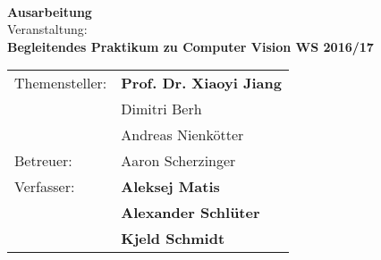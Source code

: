 \thispagestyle{empty}
\begin{center}
\vspace*{2cm}
\vspace*{2cm}
\Large
\textbf{\inserttitle}\\
\normalsize
\vspace*{2cm}
\textbf{Ausarbeitung}\\
\vspace*{1cm}
Veranstaltung:\\
\textbf{Begleitendes Praktikum zu Computer Vision WS 2016/17}
\end{center}
\vfill

\begin{center}
\begin{tabular}{ll}
Themensteller:&\textbf{Prof. Dr. Xiaoyi Jiang}\\
&Dimitri Berh\\
&Andreas Nienkötter\\
Betreuer:&Aaron Scherzinger\\
Verfasser:&\textbf{Aleksej Matis}\\
&\textbf{Alexander Schlüter}\\
&\textbf{Kjeld Schmidt}
\end{tabular} 
\end{center}